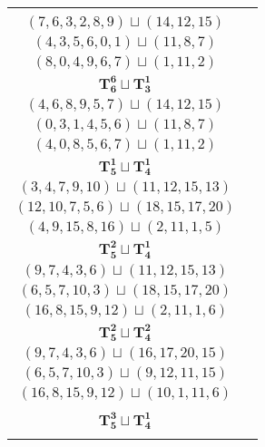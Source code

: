 \documentclass{article}
\begin{document}
\begin{longtable}{|c|c|}
\begin{tabular}{c}
        $(0,2,4,7,1,5)\sqcup(12,11,13)$ \\ 
        $(7,6,3,2,8,9)\sqcup(14,12,15)$ \\ 
        $(4,3,5,6,0,1)\sqcup(11,8,7)$ \\ 
        $(8,0,4,9,6,7)\sqcup(1,11,2)$
        \end{tabular} \\ 
        \hline
        $\mathbf{T_{6}^{6}} \sqcup \mathbf{T_{3}^{1}}$ & \begin{tabular}{c}
        $(0,2,1,3,4,5)\sqcup(12,11,14)$ \\ 
        $(4,6,8,9,5,7)\sqcup(14,12,15)$ \\ 
        $(0,3,1,4,5,6)\sqcup(11,8,7)$ \\ 
        $(4,0,8,5,6,7)\sqcup(1,11,2)$
        \end{tabular} \\ 
        \hline
        $\mathbf{T_{5}^{1}} \sqcup \mathbf{T_{4}^{1}}$ & \begin{tabular}{c}
        $(2,4,6,9,12)\sqcup(16,15,14,13)$ \\ 
        $(3,4,7,9,10)\sqcup(11,12,15,13)$ \\ 
        $(12,10,7,5,6)\sqcup(18,15,17,20)$ \\ 
        $(4,9,15,8,16)\sqcup(2,11,1,5)$
        \end{tabular} \\ 
        \hline
        $\mathbf{T_{5}^{2}} \sqcup \mathbf{T_{4}^{1}}$ & \begin{tabular}{c}
        $(12,9,6,4,11)\sqcup(17,16,15,14)$ \\ 
        $(9,7,4,3,6)\sqcup(11,12,15,13)$ \\ 
        $(6,5,7,10,3)\sqcup(18,15,17,20)$ \\ 
        $(16,8,15,9,12)\sqcup(2,11,1,6)$
        \end{tabular} \\ 
        \hline
        $\mathbf{T_{5}^{2}} \sqcup \mathbf{T_{4}^{2}}$ & \begin{tabular}{c}
        $(4,6,9,11,8)\sqcup(16,15,18,14)$ \\ 
        $(9,7,4,3,6)\sqcup(16,17,20,15)$ \\ 
        $(6,5,7,10,3)\sqcup(9,12,11,15)$ \\ 
        $(16,8,15,9,12)\sqcup(10,1,11,6)$
        \end{tabular} \\ 
        \hline
        $\mathbf{T_{5}^{3}} \sqcup \mathbf{T_{4}^{1}}$ & \begin{tabular}{c}

\end{tabular}
\end{longtable}
\end{document}

